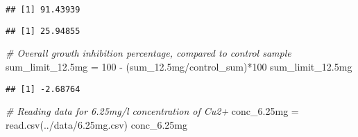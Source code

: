 \documentclass[
]{article}
\newenvironment{Shaded}{\begin{snugshade}}{\end{snugshade}}
\newcommand{\CommentTok}[1]{\textcolor[rgb]{0.56,0.35,0.01}{\textit{#1}}}
\newcommand{\DecValTok}[1]{\textcolor[rgb]{0.00,0.00,0.81}{#1}}
\newcommand{\FloatTok}[1]{\textcolor[rgb]{0.00,0.00,0.81}{#1}}
\newcommand{\FunctionTok}[1]{\textcolor[rgb]{0.00,0.00,0.00}{#1}}
\newcommand{\NormalTok}[1]{#1}
\newcommand{\OtherTok}[1]{\textcolor[rgb]{0.56,0.35,0.01}{#1}}
\newcommand{\SpecialCharTok}[1]{\textcolor[rgb]{0.00,0.00,0.00}{#1}}
\newcommand{\StringTok}[1]{\textcolor[rgb]{0.31,0.60,0.02}{#1}}
\begin{document}
\begin{verbatim}
## [1] 91.43939
\end{verbatim}

\begin{Shaded}
\end{Shaded}

\begin{verbatim}
## [1] 25.94855
\end{verbatim}

\begin{Shaded}
\begin{Highlighting}[]
\CommentTok{\# Overall growth inhibition percentage, compared to control sample}
\NormalTok{sum\_limit\_12}\FloatTok{.5}\NormalTok{mg }\OtherTok{=} \DecValTok{100} \SpecialCharTok{{-}}\NormalTok{ (sum\_12}\FloatTok{.5}\NormalTok{mg}\SpecialCharTok{/}\NormalTok{control\_sum)}\SpecialCharTok{*}\DecValTok{100}
\NormalTok{sum\_limit\_12}\FloatTok{.5}\NormalTok{mg}
\end{Highlighting}
\end{Shaded}

\begin{verbatim}
## [1] -2.68764
\end{verbatim}

\begin{Shaded}
\begin{Highlighting}[]
\CommentTok{\# Reading data for 6.25mg/l concentration of Cu2+}
\NormalTok{conc\_6}\FloatTok{.25}\NormalTok{mg }\OtherTok{=} \FunctionTok{read.csv}\NormalTok{(}\StringTok{\textquotesingle{}../data/6.25mg.csv\textquotesingle{}}\NormalTok{)}
\NormalTok{conc\_6}\FloatTok{.25}\NormalTok{mg}
\end{Highlighting}
\end{Shaded}
\end{document}
